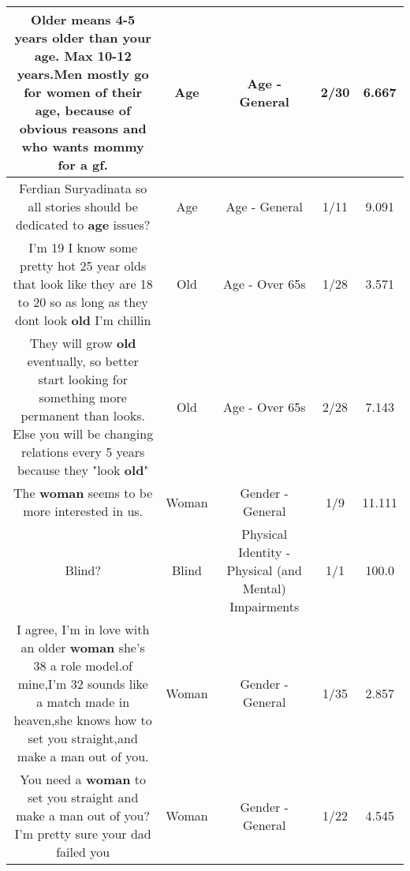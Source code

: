 \documentclass[11pt]{article}
\newlength\mylength
\begin{document}
\begin{center}
\begin{longtable}{|C{.65\mylength}|C{.30\mylength}|C{.12\mylength}|C{.12\mylength}|C{.12\mylength}|}
  \small Older means 4-5 years older than your \textbf{age}. Max 10-12 years.Men mostly go for women of their \textbf{age}, because of obvious reasons and who wants mommy for a gf.\normalsize   & Age & Age - General & 2/30 & 6.667 \\  \hline
  \small Ferdian Suryadinata so all stories should be dedicated to \textbf{age} issues?\normalsize   & Age & Age - General & 1/11 & 9.091 \\  \hline
  \small I'm 19 I know some pretty hot 25 year olds that look like they are 18 to 20 so as long as they dont look \textbf{old} I'm chillin\normalsize   & Old & Age - Over 65s & 1/28 & 3.571 \\  \hline
  \small They will grow \textbf{old} eventually, so better start looking for something more permanent than looks. Else you will be changing relations every 5 years because they "look \textbf{old}"\normalsize   & Old & Age - Over 65s & 2/28 & 7.143 \\  \hline
  \small The \textbf{woman} seems to be more interested in us.\normalsize   & Woman & Gender - General & 1/9 & 11.111 \\  \hline
  \small Blind?\normalsize   & Blind & Physical Identity - Physical (and Mental) Impairments & 1/1 & 100.0 \\  \hline
  \small I agree, I'm in love with an older \textbf{woman} she's 38 a role model.of mine,I'm 32 sounds like a match made in heaven,she knows how to set you straight,and make a man out of you.\normalsize   & Woman & Gender - General & 1/35 & 2.857 \\  \hline
  \small You need a \textbf{woman} to set you straight and make a man out of you? I'm pretty sure your dad failed you\normalsize   & Woman & Gender - General & 1/22 & 4.545 \\  \hline

\end{longtable}
\end{center}
\end{document}
